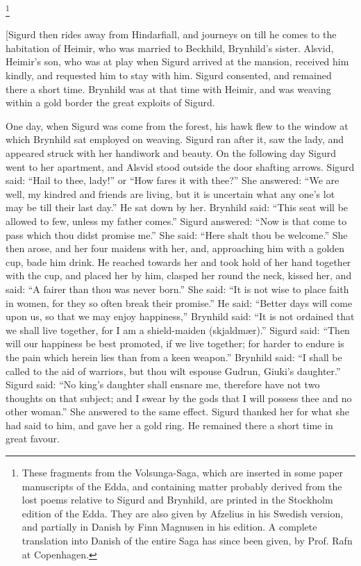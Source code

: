 
\footnote{These fragments from the Volsunga-Saga, which are
inserted in some paper manuscripts of the Edda, and containing matter
probably derived from the lost poems relative to Sigurd and Brynhild,
are printed in the Stockholm edition of the Edda. They are also given
by Afzelius in his Swedish version, and partially in Danish by Finn
Magnusen in his edition. A complete translation into Danish of the
entire Saga has since been given, by Prof. Rafn at Copenhagen.}

[Sigurd then rides away from Hindarfiall, and journeys on till he
comes to the habitation of Heimir, who was married to Beckhild,
Brynhild's sister. Alsvid, Heimir's son, who was at play when Sigurd
arrived at the mansion, received him kindly, and requested him to stay
with him. Sigurd consented, and remained there a short time. Brynhild
was at that time with Heimir, and was weaving within a gold border the
great exploits of Sigurd.

One day, when Sigurd was come from the forest, his hawk flew to the
window at which Brynhild sat employed on weaving. Sigurd ran after it,
saw the lady, and appeared struck with her handiwork and beauty. On
the following day Sigurd went to her apartment, and Alsvid stood
outside the door shafting arrows. Sigurd said: ``Hail to thee, lady!''
or ``How fares it with thee?'' She answered: ``We are well, my kindred
and friends are living, but it is uncertain what any one's lot may be
till their last day.'' He sat down by her. Brynhild said: ``This seat
will be allowed to few, unless my father comes.'' Sigurd answered: ``Now
is that come to pass which thou didst promise me.'' She said: ``Here
shalt thou be welcome.'' She then arose, and her four maidens with her,
and, approaching him with a golden cup, bade him drink. He reached
towards her and took hold of her hand together with the cup, and
placed her by him, clasped her round the neck, kissed her, and said:
``A fairer than thou was never born.'' She said: ``It is not wise to
place faith in women, for they so often break their promise.'' He said:
``Better days will come upon us, so that we may enjoy happiness,''
Brynhild said: ``It is not ordained that we shall live together, for I
am a shield-maiden (skjaldmær).'' Sigurd said: ``Then will our happiness
be best promoted, if we live together; for harder to endure is the
pain which herein lies than from a keen weapon.'' Brynhild said: ``I
shall be called to the aid of warriors, but thou wilt espouse Gudrun,
Giuki's daughter.'' Sigurd said: ``No king's daughter shall ensnare me,
therefore have not two thoughts on that subject; and I swear by the
gods that I will possess thee and no other woman.'' She answered to the
same effect. Sigurd thanked her for what she had said to him, and gave
her a gold ring. He remained there a short time in great favour.

